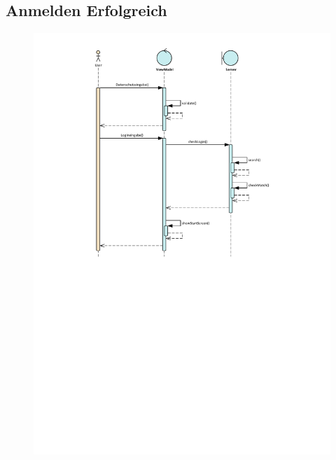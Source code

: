 \subsection*{Anmelden Erfolgreich}
\vfill
\begin{figure}[h!]
	\centering
	\includegraphics[width = 0.8\linewidth]{docs/6_Sequenzdiagramme/Marius/AnmeldenSuccess.pdf}
	\label{fig:SeqDia_Anmelden_Erfolgreich}
\end{figure}

\vfill
\pagebreak

